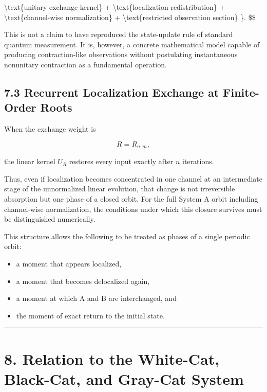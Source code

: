 \documentclass[
  a4paper,
  10pt]{article}
\providecommand{\tightlist}{%
  \setlength{\itemsep}{0pt}\setlength{\parskip}{0pt}}
\begin{document}
\textbackslash text\{unitary exchange kernel\} +
\textbackslash text\{localization redistribution\} +
\textbackslash text\{channel-wise normalization\} +
\textbackslash text\{restricted observation section\} \}. \$\$

This is not a claim to have reproduced the state-update rule of standard
quantum measurement. It is, however, a concrete mathematical model
capable of producing contraction-like observations without postulating
instantaneous nonunitary contraction as a fundamental operation.

\subsection{7.3 Recurrent Localization Exchange at Finite-Order
Roots}\label{73-recurrent-localization-exchange-at-finite-order-roots}

When the exchange weight is

\[
R=R_{n,m},
\]

the linear kernel \(U_R\) restores every input exactly after \(n\)
iterations.

Thus, even if localization becomes concentrated in one channel at an
intermediate stage of the unnormalized linear evolution, that change is
not irreversible absorption but one phase of a closed orbit. For the
full System A orbit including channel-wise normalization, the conditions
under which this closure survives must be distinguished numerically.

This structure allows the following to be treated as phases of a single
periodic orbit:

\begin{itemize}
\tightlist
\item
  a moment that appears localized,
\item
  a moment that becomes delocalized again,
\item
  a moment at which A and B are interchanged, and
\item
  the moment of exact return to the initial state.
\end{itemize}

\begin{center}\rule{0.5\linewidth}{0.5pt}\end{center}

\section{8. Relation to the White-Cat, Black-Cat, and Gray-Cat
System}\label{8-relation-to-the-white-cat-black-cat-and-gray-cat-system}
\end{document}
